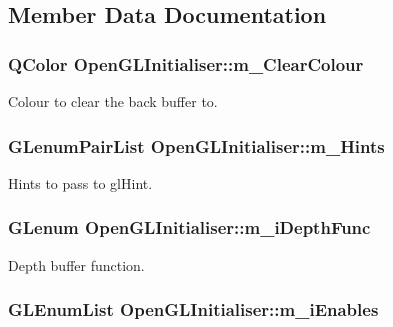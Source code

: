 \subsection{Member Data Documentation}
\hypertarget{struct_open_g_l_initialiser_a65011f15005795684b97f8900ab39bf6}{
\subsubsection[{m\-\_\-\-Clear\-Colour}]{\setlength{\rightskip}{0pt plus 5cm}Q\-Color Open\-G\-L\-Initialiser\-::m\-\_\-\-Clear\-Colour}}\label{struct_open_g_l_initialiser_a65011f15005795684b97f8900ab39bf6}
Colour to clear the back buffer to. \hypertarget{struct_open_g_l_initialiser_a52aff5a3c02a0b30274f95e9d899039d}{
\subsubsection[{m\-\_\-\-Hints}]{\setlength{\rightskip}{0pt plus 5cm}G\-Lenum\-Pair\-List Open\-G\-L\-Initialiser\-::m\-\_\-\-Hints}}\label{struct_open_g_l_initialiser_a52aff5a3c02a0b30274f95e9d899039d}
Hints to pass to gl\-Hint. \hypertarget{struct_open_g_l_initialiser_a57861877fcf98b47179a46e4800cf0db}{
\subsubsection[{m\-\_\-i\-Depth\-Func}]{\setlength{\rightskip}{0pt plus 5cm}G\-Lenum Open\-G\-L\-Initialiser\-::m\-\_\-i\-Depth\-Func}}\label{struct_open_g_l_initialiser_a57861877fcf98b47179a46e4800cf0db}
Depth buffer function. \hypertarget{struct_open_g_l_initialiser_a4b84e53b0545039933e2428b5a902d2d}{
\subsubsection[{m\-\_\-i\-Enables}]{\setlength{\rightskip}{0pt plus 5cm}G\-L\-Enum\-List Open\-G\-L\-Initialiser\-::m\-\_\-i\-Enables}}\label{struct_open_g_l_initialiser_a4b84e53b0545039933e2428b5a902d2d}

